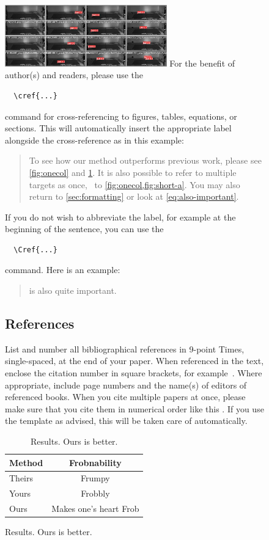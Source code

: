 \documentclass[10pt,twocolumn,letterpaper]{article}
\begin{document}
\begin{figure}{
  \includegraphics[width=7cm]{validation.jpeg}
}
For the benefit of author(s) and readers, please use the
{\small\begin{verbatim}
  \cref{...}
\end{verbatim}}  command for cross-referencing to figures, tables, equations, or sections.
This will automatically insert the appropriate label alongside the cross-reference as in this example:
\begin{quotation}
  To see how our method outperforms previous work, please see \cref{fig:onecol} and \cref{tab:example}.
  It is also possible to refer to multiple targets as once, \eg~to \cref{fig:onecol,fig:short-a}.
  You may also return to \cref{sec:formatting} or look at \cref{eq:also-important}.
\end{quotation}
If you do not wish to abbreviate the label, for example at the beginning of the sentence, you can use the
{\small\begin{verbatim}
  \Cref{...}
\end{verbatim}}
command. Here is an example:
\begin{quotation}
   is also quite important.
\end{quotation}

\subsection{References}

List and number all bibliographical references in 9-point Times, single-spaced, at the end of your paper.
When referenced in the text, enclose the citation number in square brackets, for
example~\cite{Authors14}.
Where appropriate, include page numbers and the name(s) of editors of referenced books.
When you cite multiple papers at once, please make sure that you cite them in numerical order like this \cite{Alpher02,Alpher03,Alpher05,Authors14b,Authors14}.
If you use the template as advised, this will be taken care of automatically.

\begin{table}
  \centering
  \begin{tabular}{@{}lc@{}}
    \toprule
    Method & Frobnability \\
    \midrule
    Theirs & Frumpy \\
    Yours & Frobbly \\
    Ours & Makes one's heart Frob\\
    \bottomrule
  \end{tabular}
  \caption{Results.   Ours is better.}
  \label{tab:example}
\end{table}


\end{figure}
\end{document}
